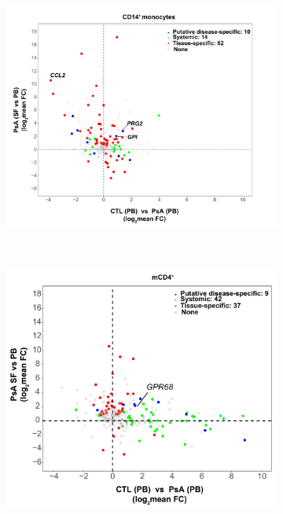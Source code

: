 \begin{figure}[htbp]
\centering
\begin{subfigure}{0.45\textwidth}
\centering
\includegraphics[width=\textwidth]{./Results3/pdfs/PSA_array_correlation_CD14_FC_HVPsA_vs_SFPBPsA_t}
\caption{\textbf{}}
\end{subfigure} \\
\begin{subfigure}{0.45\textwidth}
\centering
\includegraphics[width=\textwidth]{./Results3/pdfs/PSA_array_correlation_CD4_FC_HVPsA_vs_SFPBPsA}

\end{subfigure}
\end{figure}
